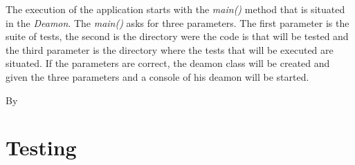 \documentclass[i2]{oss}
\newcommand{\class}[1]{\emph{#1}}
\newcommand{\method}[1]{\emph{#1}}
\begin{document}
The execution of the application starts with the \method{main()} method that is situated in the \class{Deamon}. The \method{main()} asks for three parameters. The first parameter is the suite of tests, the second is the directory were the code is that will be tested and the third parameter is the directory where the tests that will be executed are situated. If the parameters are correct, the deamon class will be created and given the three parameters and a console of his deamon will be started.  

By 







\section{Testing}
\label{ssec:testing}
\end{document}

